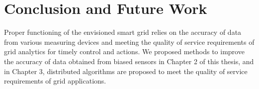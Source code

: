 \chapter{Conclusion and Future Work} \label{conc}
Proper functioning of the envisioned smart grid relies on the accuracy of data from various measuring devices and meeting the quality of service requirements of grid analytics for timely control and actions.   We proposed methods to improve the accuracy of data obtained from biased sensors in Chapter 2 of this thesis, and in Chapter 3, distributed algorithms are proposed to meet the quality of service requirements of grid applications.  

